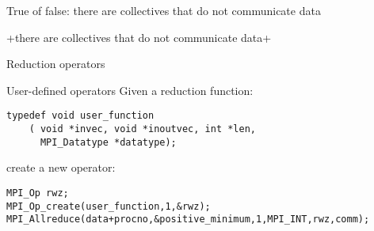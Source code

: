 \begin{reviewframe}
  True of false: there are collectives that do not communicate data

  \slackpollTF+there are collectives that do not communicate data+
\end{reviewframe}

 {Reduction operators}

\begin{numberedframe}{User-defined operators}
\lstset{language=C}
Given a reduction function:
\begin{lstlisting}
typedef void user_function
    ( void *invec, void *inoutvec, int *len, 
      MPI_Datatype *datatype); 
\end{lstlisting}  
create a new operator:
\begin{lstlisting}
MPI_Op rwz;
MPI_Op_create(user_function,1,&rwz);
MPI_Allreduce(data+procno,&positive_minimum,1,MPI_INT,rwz,comm);
\end{lstlisting}
\end{numberedframe}

\begin{exerciseframe}[onenorm]
  
\end{exerciseframe}

\endinput

\begin{numberedframe}{}
\begin{lstlisting}
  
\end{lstlisting}
\end{numberedframe}

\begin{numberedframe}{}
\begin{lstlisting}
  
\end{lstlisting}
\end{numberedframe}

\begin{numberedframe}{}
\begin{verbatim}
  
\end{verbatim}
\end{numberedframe}

